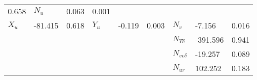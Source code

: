 \begin{table}[!htb]
\begin{tabular}{|T|T|T|T|T|T|T|T|T|}
0.658
&

\( N_{u} \)
&

0.063
&

0.001
\\


\( X_{u} \)
&

-81.415
&

0.618
&

\( Y_{u} \)
&

-0.119
&

0.003
&

\( N_{v} \)
&

-7.156
&

0.016
\\
&&&&&&

\( N_{T\delta} \)
&

-391.596
&

0.941
\\
&&&&&&

\( N_{vv\delta} \)
&

-19.257
&

0.089
\\
&&&&&&

\( N_{ur} \)
&

102.252
&

0.183
\\
\hline
\end{tabular}

\end{table}

